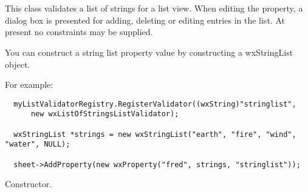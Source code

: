 \section{}\label{wxlistofstringslistvalidator}

This class validates a list of strings for a list view. When editing the property,
a dialog box is presented for adding, deleting or editing entries in the list.
At present no constraints may be supplied.

You can construct a string list property value by constructing a wxStringList object.

For example:

\begin{verbatim}
  myListValidatorRegistry.RegisterValidator((wxString)"stringlist",
      new wxListOfStringsListValidator);

  wxStringList *strings = new wxStringList("earth", "fire", "wind", "water", NULL);

  sheet->AddProperty(new wxProperty("fred", strings, "stringlist"));
\end{verbatim}






Constructor.

